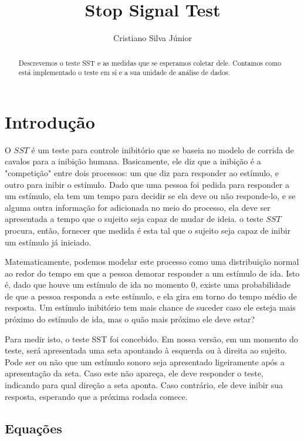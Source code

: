\documentclass[12pt, a4paper, twoside]{article}
\begin{document}
\title{Stop Signal Test}
\author{Cristiano Silva Júnior}
\maketitle

\begin{abstract}
Descrevemos o teste SST e as medidas que se esperamos coletar dele. Contamos como está implementado o teste em si e a sua unidade de análise de dados.

\end{abstract}

\section{Introdução}

O $SST$ é um teste para controle inibitório que se baseia no modelo de corrida de cavalos para a inibição humana. Basicamente, ele diz que a inibição é a "competição" entre dois processos: um que diz para responder ao estímulo, e outro para inibir o estímulo. Dado que uma pessoa foi pedida para responder a um estímulo, ela tem um tempo para decidir se ela deve ou não responde-lo, e se alguma outra informação for adicionada no meio do processo, ela deve ser apresentada a tempo que o sujeito seja capaz de mudar de ideia. o teste $SST$ procura, então, fornecer que medida é esta tal que o sujeito seja capaz de inibir um estímulo já iniciado.

Matematicamente, podemos modelar este processo como uma distribuição normal ao redor do tempo em que a pessoa demorar responder a um estímulo de ida. Isto é, dado que houve um estímulo de ida no momento 0, existe uma probabilidade de que a pessoa responda a este estímulo, e ela gira em torno do tempo médio de resposta. Um estímulo inibitório tem mais chance de suceder caso ele esteja mais próximo do estímulo de ida, mas o quão mais próximo ele deve estar? 

Para medir isto, o teste SST foi concebido. Em nossa versão, em um momento do teste, será apresentada uma seta apontando à esquerda ou à direita ao sujeito. Pode ser ou não que um estímulo sonoro seja apresentado ligeiramente após a apresentação da seta. Caso este não apareça, ele deve responder o teste, indicando para qual direção a seta aponta. Caso contrário, ele deve inibir sua resposta, esperando que a próxima rodada comece.

\subsection{Equações}
\end{document}
